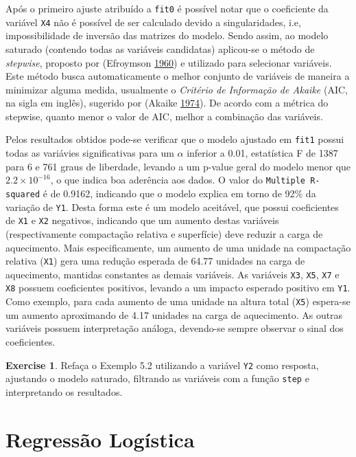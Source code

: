 \documentclass[
]{book}
\theoremstyle{definition}
\theoremstyle{definition}
\theoremstyle{definition}
\newtheorem{exercise}{Exercise}[chapter]
\theoremstyle{remark}
\begin{document}
Após o primeiro ajuste atribuído a \texttt{fit0} é possível notar que o coeficiente da variável \texttt{X4} não é possível de ser calculado devido a singularidades, i.e, impossibilidade de inversão das matrizes do modelo. Sendo assim, ao modelo saturado (contendo todas as variáveis candidatas) aplicou-se o método de \emph{stepwise}, proposto por (Efroymson \protect\hyperlink{ref-efroymson1960multiple}{1960}) e utilizado para selecionar variáveis. Este método busca automaticamente o melhor conjunto de variáveis de maneira a minimizar alguma medida, usualmente o \emph{Critério de Informação de Akaike} (AIC, na sigla em inglês), sugerido por (Akaike \protect\hyperlink{ref-akaike1974new}{1974}). De acordo com a métrica do stepwise, quanto menor o valor de AIC, melhor a combinação das variáveis.

Pelos resultados obtidos pode-se verificar que o modelo ajustado em \texttt{fit1} possui todas as variávies significativas para um \(\alpha\) inferior a 0.01, estatística F de 1387 para 6 e 761 graus de liberdade, levando a um p-value geral do modelo menor que \(2.2 \times 10^{-16}\), o que indica boa aderência aos dados. O valor do \texttt{Multiple\ R-squared} é de 0.9162, indicando que o modelo explica em torno de 92\% da variação de \texttt{Y1}. Desta forma este é um modelo aceitável, que possui coeficientes de \texttt{X1} e \texttt{X2} negativos, indicando que um aumento destas variáveis (respectivamente compactação relativa e superfície) deve reduzir a carga de aquecimento. Mais especificamente, um aumento de uma unidade na compactação relativa (\texttt{X1}) gera uma redução esperada de 64.77 unidades na carga de aquecimento, mantidas constantes as demais variáveis. As variáveis \texttt{X3}, \texttt{X5}, \texttt{X7} e \texttt{X8} possuem coeficientes positivos, levando a um impacto esperado positivo em \texttt{Y1}. Como exemplo, para cada aumento de uma unidade na altura total (\texttt{X5}) espera-se um aumento aproximando de 4.17 unidades na carga de aquecimento. As outras variáveis possuem interpretação análoga, devendo-se sempre observar o sinal dos coeficientes.

\begin{exercise}
\protect\hypertarget{exr:unnamed-chunk-130}{}{\label{exr:unnamed-chunk-130} }Refaça o Exemplo 5.2 utilizando a variável \texttt{Y2} como resposta, ajustando o modelo saturado, filtrando as variáveis com a função \texttt{step} e interpretando os resultados.
\end{exercise}

\hypertarget{regressuxe3o-loguxedstica}{%
\section{Regressão Logística}\label{regressuxe3o-loguxedstica}}
\end{document}
